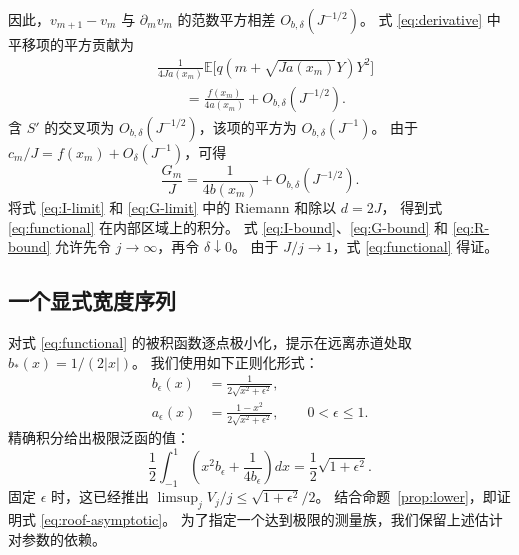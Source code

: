 \documentclass[aps,pra,reprint,superscriptaddress,longbibliography]{revtex4-2}
\theoremstyle{remark}
\newcommand{\E}{\mathbb E}
\begin{document}
因此，$v_{m+1}-v_m$ 与 $\partial_mv_m$ 的范数平方相差 $O_{b,\delta}(J^{-1/2})$。
式 \eqref{eq:derivative} 中平移项的平方贡献为
\begin{align*}
 &\frac1{4Ja(x_m)}\E\bigl[q(m+\sqrt{Ja(x_m)}Y)Y^2\bigr]\\
 &\qquad=\frac{f(x_m)}{4a(x_m)}+O_{b,\delta}(J^{-1/2}).
\end{align*}
含 $S'$ 的交叉项为 $O_{b,\delta}(J^{-1/2})$，该项的平方为 $O_{b,\delta}(J^{-1})$。
由于 $c_m/J=f(x_m)+O_\delta(J^{-1})$，可得
\begin{equation}
 \frac{G_m}{J}=\frac1{4b(x_m)}+O_{b,\delta}(J^{-1/2}).
 \label{eq:G-limit}
\end{equation}
将式 \eqref{eq:I-limit} 和 \eqref{eq:G-limit} 中的 Riemann 和除以 $d=2J$，
得到式 \eqref{eq:functional} 在内部区域上的积分。
式 \eqref{eq:I-bound}、\eqref{eq:G-bound} 和 \eqref{eq:R-bound}
允许先令 $j\to\infty$，再令 $\delta\downarrow0$。
由于 $J/j\to1$，式 \eqref{eq:functional} 得证。

\subsection{一个显式宽度序列}

对式 \eqref{eq:functional} 的被积函数逐点极小化，提示在远离赤道处取 $b_*(x)=1/(2|x|)$。
我们使用如下正则化形式：
\begin{equation}
\begin{aligned}
b_\epsilon(x)&=\frac1{2\sqrt{x^2+\epsilon^2}},\\
a_\epsilon(x)&=\frac{1-x^2}{2\sqrt{x^2+\epsilon^2}},
\qquad 0<\epsilon\leq1.
\end{aligned}
\label{eq:regularized-width}
\end{equation}
精确积分给出极限泛函的值：
\begin{equation}
 \frac12\int_{-1}^1\left(x^2b_\epsilon+\frac1{4b_\epsilon}\right)dx
 =\frac12\sqrt{1+\epsilon^2}.
 \label{eq:integral}
\end{equation}
固定 $\epsilon$ 时，这已经推出 $\limsup_jV_j/j\leq\sqrt{1+\epsilon^2}/2$。
结合命题~\ref{prop:lower}，即证明式 \eqref{eq:roof-asymptotic}。
为了指定一个达到极限的测量族，我们保留上述估计对参数的依赖。
\end{document}

